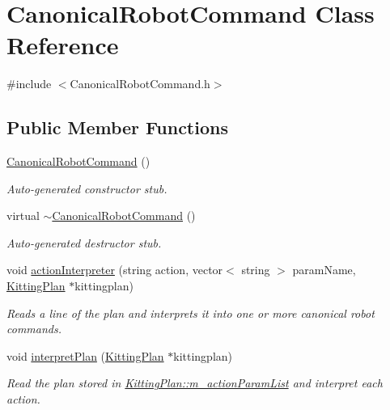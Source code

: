 \hypertarget{class_canonical_robot_command}{
\section{CanonicalRobotCommand Class Reference}
\label{class_canonical_robot_command}
}


{\ttfamily \#include $<$CanonicalRobotCommand.h$>$}

\subsection*{Public Member Functions}
\begin{DoxyCompactItemize}
\item 
\hyperlink{class_canonical_robot_command_a26b956d2026a0733c136bfdf57d74477}{CanonicalRobotCommand} ()
\begin{DoxyCompactList}\small\item\em Auto-\/generated constructor stub. \item\end{DoxyCompactList}\item 
virtual \hyperlink{class_canonical_robot_command_a7ab8d0a17a3554878ff5aba8c9170936}{$\sim$CanonicalRobotCommand} ()
\begin{DoxyCompactList}\small\item\em Auto-\/generated destructor stub. \item\end{DoxyCompactList}\item 
void \hyperlink{class_canonical_robot_command_a10f1fb20f4c17d0a37b747356378f29c}{actionInterpreter} (string action, vector$<$ string $>$ paramName, \hyperlink{class_kitting_plan}{KittingPlan} $\ast$kittingplan)
\begin{DoxyCompactList}\small\item\em Reads a line of the plan and interprets it into one or more canonical robot commands. \item\end{DoxyCompactList}\item 
void \hyperlink{class_canonical_robot_command_a8b54b12dc029042eedfa15598f671ac6}{interpretPlan} (\hyperlink{class_kitting_plan}{KittingPlan} $\ast$kittingplan)
\begin{DoxyCompactList}\small\item\em Read the plan stored in \hyperlink{class_kitting_plan_a8293312cf9137906c868994b4ade4587}{KittingPlan::m\_\-actionParamList} and interpret each action. \item\end{DoxyCompactList}\item 

\end{DoxyCompactItemize}
